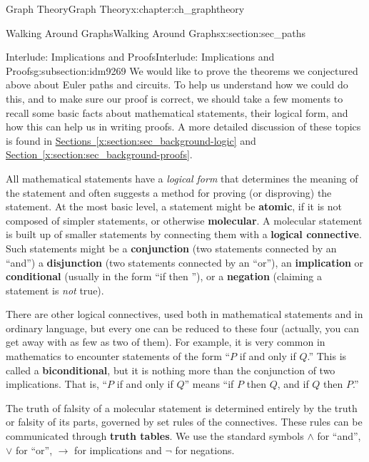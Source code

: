 \documentclass[oneside,10pt,]{book}
\newcommand{\terminology}[1]{\textbf{#1}}
\numberwithin{equation}{chapter}
\def\imp{\rightarrow}
\begin{document}
\begin{chapterptx}{Graph Theory}{}{Graph Theory}{}{}{x:chapter:ch_graphtheory}
\begin{sectionptx}{Walking Around Graphs}{}{Walking Around Graphs}{}{}{x:section:sec_paths}
\typeout{************************************************}
%
\begin{subsectionptx}{Interlude: Implications and Proofs}{}{Interlude: Implications and Proofs}{}{}{g:subsection:idm9269}
We would like to prove the theorems we conjectured above about Euler paths and circuits.  To help us understand how we could do this, and to make sure our proof is correct, we should take a few moments to recall some basic facts about mathematical statements, their logical form, and how this can help us in writing proofs.  A more detailed discussion of these topics is found in \hyperref[x:section:sec_background-logic]{Sections~\ref{x:section:sec_background-logic}} and \hyperref[x:section:sec_background-proofs]{Section~\ref{x:section:sec_background-proofs}}.%
\par
All mathematical statements have a \emph{logical form} that determines the meaning of the statement and often suggests a method for proving (or disproving) the statement.  At the most basic level, a statement might be \terminology{atomic}, if it is not composed of simpler statements, or otherwise \terminology{molecular}.  A molecular statement is built up of smaller statements by connecting them with a \terminology{logical connective}. Such statements might be a \terminology{conjunction} (two statements connected by an ``and'') a \terminology{disjunction} (two statements connected by an ``or''), an \terminology{implication} or \terminology{conditional} (usually in the form ``if \textellipsis{} then \textellipsis{}''), or a \terminology{negation} (claiming a statement is \emph{not} true).%
\par
There are other logical connectives, used both in mathematical statements and in ordinary language, but every one can be reduced to these four (actually, you can get away with as few as two of them).   For example, it is very common in mathematics to encounter statements of the form ``\(P\) if and only if \(Q\).''  This is called a \terminology{biconditional}, but it is nothing more than the conjunction of two implications.  That is, ``\(P\) if and only if \(Q\)'' means ``if \(P\) then \(Q\), and if \(Q\) then \(P\).''%
\par
The truth of falsity of a molecular statement is determined entirely by the truth or falsity of its parts, governed by set rules of the connectives.  These rules can be communicated through \terminology{truth tables}.  We use the standard symbols \(\wedge\) for ``and'', \(\vee\) for ``or'', \(\imp\) for implications and \(\neg\) for negations.%

\end{subsectionptx}
\end{sectionptx}
\end{chapterptx}
\end{document}
